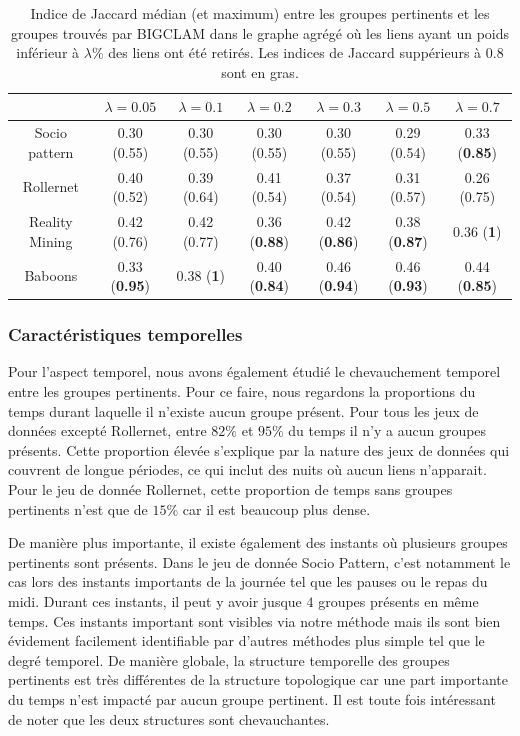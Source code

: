 \begin{table}
\centering
\begin{tabular}{|c|c|c|c|c|c|c|}
\hline  \rule[-1ex]{0pt}{3.5ex}  & $\lambda= 0.05$ &$\lambda= 0.1$ & $\lambda=0.2$ & $\lambda=0.3$ & $\lambda=0.5$ & $\lambda=0.7$ \\ 
\hline Socio pattern & 0.30 (0.55)  & 0.30 (0.55)  & 0.30 (0.55)  & 0.30 (0.55)  & 0.29 (0.54) & 0.33 (\textbf{0.85})  \\ 
\hline Rollernet & 0.40 (0.52) & 0.39 (0.64) & 0.41 (0.54) & 0.37 (0.54) & 0.31 (0.57)  &  0.26 (0.75) \\ 
\hline Reality Mining & 0.42 (0.76)  & 0.42 (0.77) & 0.36 (\textbf{0.88}) & 0.42 (\textbf{0.86}) & 0.38 (\textbf{0.87})  & 0.36 (\textbf{1}) \\ 
\hline Baboons & 0.33 (\textbf{0.95}) & 0.38 (\textbf{1}) & 0.40 (\textbf{0.84}) & 0.46 (\textbf{0.94}) & 0.46 (\textbf{0.93}) & 0.44 (\textbf{0.85}) \\ 
\hline 
\end{tabular} 
\caption{Indice de Jaccard médian (et maximum) entre les groupes pertinents et les groupes trouvés par \textsc{BIGCLAM} dans le graphe agrégé où  les liens ayant un poids inférieur à $\lambda\%$ des liens ont été retirés.
Les indices de Jaccard suppérieurs à $0.8$ sont en gras.}
\label{tab:Jaccard}  
\end{table}

\subsubsection{Caractéristiques temporelles}
Pour l'aspect temporel, nous avons également étudié le chevauchement temporel entre les groupes pertinents.
Pour ce faire, nous regardons la proportions du temps durant laquelle il n'existe aucun groupe présent.
Pour tous les jeux de données excepté Rollernet, entre $82\%$ et $95\%$ du temps il n'y a aucun groupes présents.
Cette proportion élevée s'explique par la nature des jeux de données qui couvrent de longue périodes, ce qui inclut des nuits où aucun liens n'apparait.
Pour le jeu de donnée Rollernet, cette proportion de temps sans groupes pertinents n'est que de $15\%$ car il est beaucoup plus dense.

De manière plus importante, il existe également des instants où plusieurs groupes pertinents sont présents.
Dans le jeu de donnée Socio Pattern, c'est notamment le cas lors des instants importants de la journée tel que les pauses ou le repas du midi.
Durant ces instants, il peut y avoir jusque $4$ groupes présents en même temps.
Ces instants important sont visibles via notre méthode mais ils sont bien évidement facilement identifiable par d'autres méthodes plus simple tel que le degré temporel.
De manière globale, la structure temporelle des groupes pertinents est très différentes de la structure topologique car une part importante du temps n'est impacté par aucun groupe pertinent.
Il est toute fois intéressant de noter que les deux structures sont chevauchantes. 



